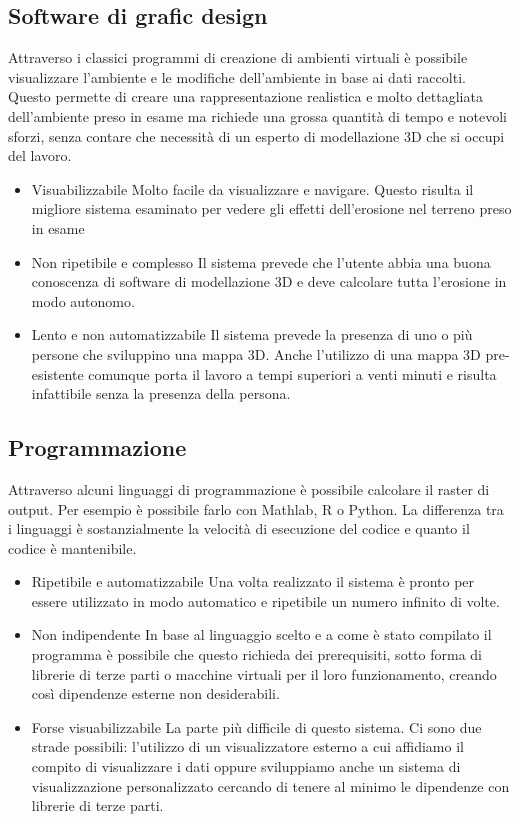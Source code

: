 \subsection{Software di grafic design}
Attraverso i classici programmi di creazione di ambienti virtuali è possibile visualizzare l'ambiente e le modifiche dell'ambiente in base ai dati raccolti. Questo permette di creare una rappresentazione realistica e molto dettagliata dell'ambiente preso in esame ma richiede una grossa quantità di tempo e notevoli sforzi, senza contare che necessità di un esperto di modellazione 3D che si occupi del lavoro.

\begin{itemize}
	\item{Visuabilizzabile} Molto facile da visualizzare e navigare. Questo risulta il migliore sistema esaminato per vedere gli effetti dell'erosione nel terreno preso in esame

	\item{Non ripetibile e complesso} Il sistema prevede che l'utente abbia una buona conoscenza di software di modellazione 3D e deve calcolare tutta l'erosione in modo autonomo.

	\item{Lento e non automatizzabile} Il sistema prevede la presenza di uno o più persone che sviluppino una mappa 3D. Anche l'utilizzo di una mappa 3D pre-esistente comunque porta il lavoro a tempi superiori a venti minuti e risulta infattibile senza la presenza della persona.
\end{itemize}


\subsection{Programmazione}
Attraverso alcuni linguaggi di programmazione è possibile calcolare il raster di output. Per esempio è possibile farlo con Mathlab, R o Python. La differenza tra i linguaggi è sostanzialmente la velocità di esecuzione del codice e quanto il codice è mantenibile.

\begin{itemize}
	\item{Ripetibile e automatizzabile} Una volta realizzato il sistema è pronto per essere utilizzato in modo automatico e ripetibile un numero infinito di volte.

	\item{Non indipendente} In base al linguaggio scelto e a come è stato compilato il programma è possibile che questo richieda dei prerequisiti, sotto forma di librerie di terze parti o macchine virtuali per il loro funzionamento, creando così dipendenze esterne non desiderabili.

	\item{Forse visuabilizzabile} La parte più difficile di questo sistema. Ci sono due strade possibili: l'utilizzo di un visualizzatore esterno a cui affidiamo il compito di visualizzare i dati oppure sviluppiamo anche un sistema di visualizzazione personalizzato cercando di tenere al minimo le dipendenze con librerie di terze parti.
	
\end{itemize}

